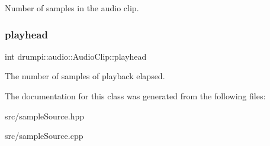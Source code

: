 Number of samples in the audio clip. \mbox{\label{classdrumpi_1_1audio_1_1AudioClip_ad901741b22d0efe60079054cb572f6f5}} 
\subsubsection{\texorpdfstring{playhead}{playhead}}
{\footnotesize\ttfamily int drumpi\+::audio\+::\+Audio\+Clip\+::playhead\hspace{0.3cm}{\ttfamily [private]}}

The number of samples of playback elapsed. 

The documentation for this class was generated from the following files\+:\begin{DoxyCompactItemize}
\item 
src/sample\+Source.\+hpp\item 
src/sample\+Source.\+cpp\end{DoxyCompactItemize}
